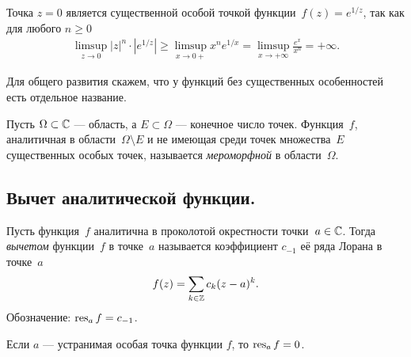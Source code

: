 \documentclass[../complex-analysis.tex]{subfiles}
\begin{document}
\begin{exmpl}
 Точка $ z=0 $ является существенной особой точкой функции~$ f(z)= e^{1 / z} $, так как для любого $ n \geqslant 0 $
 \begin{align*}
  \limsup_{z \to 0} \left| z \right|^{n} \cdot \left| e^{1 / z} \right| \geqslant \limsup_{x \to 0+} x^{n} e^{1 / x} = \limsup_{x \to +\infty} \frac{e^{x}}{x^{n}} = +\infty.
 \end{align*}
\end{exmpl}

Для общего развития скажем, что у функций без существенных особенностей есть отдельное название.

\begin{df}
 Пусть $ \Omega \subset \mathbb{C} $ --- область, а $ E \subset \Omega $ --- конечное число точек. Функция~$ f $, аналитичная в области~$ \Omega \setminus E $ и не имеющая среди точек множества~$ E $ существенных особых точек, называется \emph{мероморфной} в области~$ \Omega $.
\end{df}

\subsection{Вычет аналитической функции.}

\begin{df}
 Пусть функция~$ f $ аналитична в проколотой окрестности точки~$ a \in \mathbb{C} $. Тогда \emph{вычетом} функции~$ f $ в точке~$ a $ называется коэффициент $ c_{-1} $ её ряда Лорана в точке~$ a $
 \begin{align*}
  f(z) = \sum_{k \in \mathbb{Z}} c_k (z-a)^{k}.
 \end{align*} Обозначение: $ \operatorname{res}_a f = c_{-1} $.
\end{df}

\begin{exmpl}
 Если $ a $ --- устранимая особая точка функции $ f $, то $ \operatorname{res}_a f = 0 $.
\end{exmpl}
\end{document}
